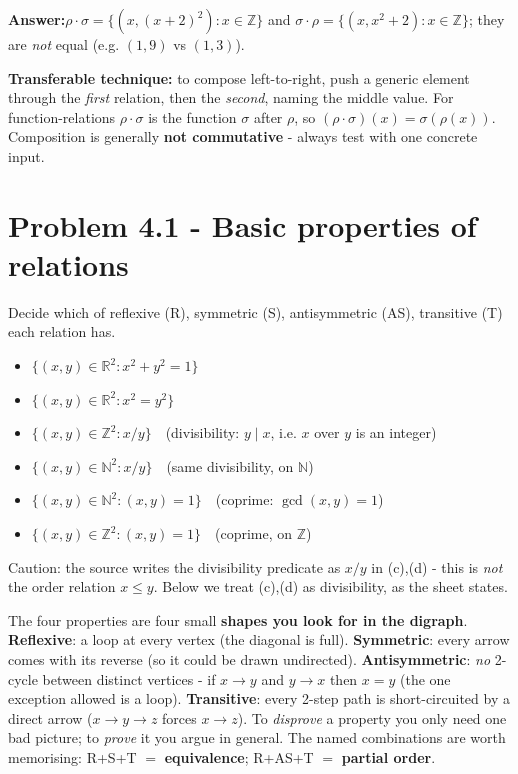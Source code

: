 \documentclass[11pt,a4paper]{article}
\newcommand{\Z}{\mathbb{Z}}
\newcommand{\R}{\mathbb{R}}
\newcommand{\N}{\mathbb{N}}
\newcommand{\answer}[1]{\begin{answerbox}\centering\textbf{Answer:}\quad #1\end{answerbox}}
\begin{document}
\answer{$\rho\cdot\sigma=\{(x,(x+2)^2):x\in\Z\}$ \quad and \quad $\sigma\cdot\rho=\{(x,x^2+2):x\in\Z\}$; \quad they are \emph{not} equal (e.g. $(1,9)$ vs $(1,3)$).}

\begin{methodbox}
\textbf{Transferable technique:} to compose left-to-right, push a generic element through the
\emph{first} relation, then the \emph{second}, naming the middle value. For function-relations
$\rho\cdot\sigma$ is the function \textquotedbl{}$\sigma$ after $\rho$\textquotedbl{}, so
$(\rho\cdot\sigma)(x)=\sigma(\rho(x))$. Composition is generally \textbf{not commutative} - always
test with one concrete input.
\end{methodbox}

\section*{Problem 4.1 - Basic properties of relations}

\begin{problembox}[4.1]
Decide which of reflexive (R), symmetric (S), antisymmetric (AS), transitive (T) each relation has.
\begin{itemize}[leftmargin=1.6em,nosep]
\item[a)] $\{(x,y)\in\R^2 : x^2+y^2=1\}$
\item[b)] $\{(x,y)\in\R^2 : x^2=y^2\}$
\item[c)] $\{(x,y)\in\Z^2 : x/y\}$\ \ (divisibility: $y\mid x$, i.e. \textquotedbl{}$x$ over $y$ is an integer\textquotedbl{})
\item[d)] $\{(x,y)\in\N^2 : x/y\}$\ \ (same divisibility, on $\N$)
\item[e)] $\{(x,y)\in\N^2 : (x,y)=1\}$\ \ (coprime: $\gcd(x,y)=1$)
\item[f)] $\{(x,y)\in\Z^2 : (x,y)=1\}$\ \ (coprime, on $\Z$)
\end{itemize}
\footnotesize Caution: the source writes the divisibility predicate as $x/y$ in (c),(d) - this is
\emph{not} the order relation $x\le y$. Below we treat (c),(d) as divisibility, as the sheet states.
\end{problembox}

\begin{ideabox}
The four properties are four small \textbf{shapes you look for in the digraph}.
\textbf{Reflexive}: a loop at every vertex (the diagonal is full).
\textbf{Symmetric}: every arrow comes with its reverse (so it could be drawn undirected).
\textbf{Antisymmetric}: \emph{no} 2-cycle between distinct vertices - if $x\to y$ and $y\to x$ then
$x=y$ (the one exception allowed is a loop).
\textbf{Transitive}: every 2-step path is short-circuited by a direct arrow ($x\to y\to z$ forces
$x\to z$). To \emph{disprove} a property you only need one bad picture; to \emph{prove} it you argue
in general. The named combinations are worth memorising: R+S+T $=$ \textbf{equivalence}; R+AS+T $=$
\textbf{partial order}.
\end{ideabox}
\end{document}
